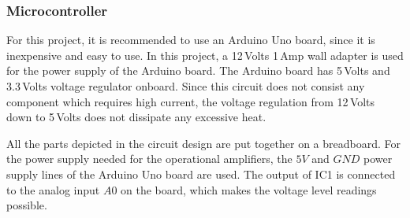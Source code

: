 \subsubsection{Microcontroller}
For this project, it is recommended to use an Arduino Uno board, since it is inexpensive and easy to use. In this project, a 12\,Volts 1\,Amp wall adapter is used for the power supply of the Arduino board. The Arduino board has 5\,Volts and 3.3\,Volts voltage regulator onboard. Since this circuit does not consist any component which requires high current, the voltage regulation from 12\,Volts down to 5\,Volts does not dissipate any excessive heat. \par
All the parts depicted in the circuit design are put together on a breadboard. For the power supply needed for the operational amplifiers, the $5V$ and $GND$ power supply lines of the Arduino Uno board are used. The output of IC1 is connected to the analog input $A0$ on the board, which makes the voltage level readings possible.


